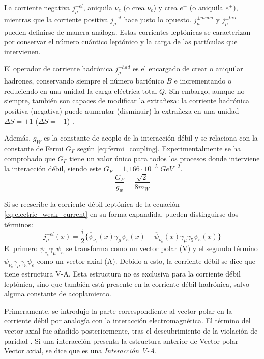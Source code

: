 La corriente negativa $j_{\mu }^{-el}$, aniquila $\nu_e$ (o crea $\overline{\nu_e}$) y crea $e^-$ (o aniquila $e^+$), mientras que la corriente positiva $j_{\mu }^{+el}$ hace justo lo opuesto. $j_{\mu }^{\pm muon}$ y $j_{\mu }^{\pm tau}$ pueden definirse de manera análoga. Estas corrientes leptónicas se caracterizan por conservar el número cuántico leptónico y la carga de las partículas que intervienen. 

El operador de corriente hadrónica $j_{\mu} ^{\pm had}$ es el encargado de crear o aniquilar hadrones, conservando siempre el número bariónico $B$ e incrementando o reduciendo en una unidad la carga eléctrica total $Q$. Sin embargo, aunque no siempre, también son capaces de modificar la extrañeza: la corriente hadrónica positiva (negativa) puede aumentar (disminuir) la extrañeza en una unidad $\Delta S = +1$ ($\Delta S = -1$) \cite{notas2020}.

Además, $g_W$ es la constante de acoplo de la interacción débil y se relaciona con la constante de Fermi $G_F$ según \ref{eq:fermi_coupling}. Experimentalmente se ha comprobado que $G_F$ tiene un valor único para todos los procesos donde interviene la interacción débil, siendo este $G_{F}=1,166 \cdot 10^{-5}$ $GeV^{−2}$.
\begin{equation}
\dfrac{G_{F}}{g_{w}}=\dfrac{\sqrt{2}}{8m_{W}}\label{eq:fermi_coupling}
\end{equation}

Si se reescribe la corriente débil leptónica de la ecuación \ref{eq:electric_weak_current} en su forma expandida, pueden distinguirse dos términos:
\begin{equation}
j_{\mu}^{+el}\left(x\right)= \dfrac{i}{2} \{ \overline{\psi}_{{\nu}_{e}}\left(x\right)\gamma _{\mu}\psi_{e}\left( x\right)- \overline{\psi}_{{\nu}_{e}}\left(x\right)\gamma _{\mu}\gamma_{5}\psi_{e}\left( x\right) \}
\end{equation}
El primero $\overline{\psi}_{{\nu}_{e}}\gamma _{\mu}\psi_{e}$ se transforma como un vector polar (V) y el segundo término $\overline{\psi}_{{\nu}_{e}}\gamma _{\mu}\gamma_{5}\psi_{e}$ como un vector axial (A). Debido a esto, la corriente débil se dice que tiene estructura V-A. Esta estructura no es exclusiva para la corriente débil leptónica, sino que también está presente en la corriente débil hadrónica, salvo alguna constante de acoplamiento. 

Primeramente, se introdujo la parte correspondiente al vector polar en la corriente débil por analogía con la interacción electromagnética. El término del vector axial fue añadido posteriormente, tras el descubrimiento de la violación de paridad \cite{Paschos}. Si una interacción presenta la estructura anterior de Vector polar- Vector axial, se dice que es una \textit{Interacción V-A}.

